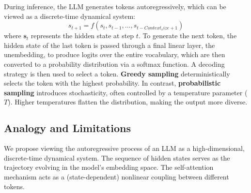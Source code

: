 \documentclass[a4paper,12pt]{article}
\begin{document}
During inference, the LLM generates tokens autoregressively, which can be viewed as a discrete-time dynamical system:
\begin{equation}
     s_{t+1} = f(s_t, s_{t-1}, ..., s_{t-Context_size+1})
\end{equation}
where $\mathbf{s}_t$ represents the hidden state at step $t$. 
To generate the next token, the hidden state of the last token is passed through a final linear layer, the unembedding, to produce logits over the entire vocabulary, which are then converted to a probability distribution via a softmax function. A decoding strategy is then used to select a token. \textbf{Greedy sampling} deterministically selects the token with the highest probability. In contrast, \textbf{probabilistic sampling} introduces stochasticity, often controlled by a temperature parameter ($T$). Higher temperatures flatten the distribution, making the output more diverse.



\subsection{Analogy and Limitations}
\label{subsec:analogy_limitations}
We propose viewing the autoregressive process of an LLM as a high-dimensional, discrete-time dynamical system. The sequence of hidden states serves as the trajectory evolving in the model's embedding space. The self-attention mechanism acts as a (state-dependent) nonlinear coupling between different tokens. 
\end{document}
